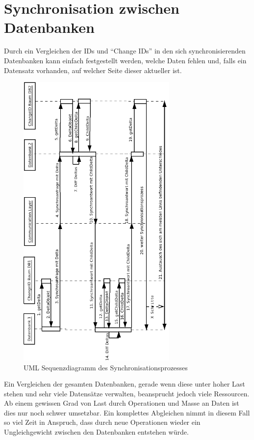 \documentclass[a4paper,11pt,oneside,%
headsepline,												%
footsepline,												%
bibtotocnumbered									%
]{scrreprt}
\begin{document}
\section{Synchronisation zwischen Datenbanken}
\label{sec:eBTreeSynchronisation}
Durch ein Vergleichen der IDs und \enquote{Change IDs} in den sich synchronisierenden Datenbanken kann einfach festgestellt werden, welche Daten fehlen und, falls ein Datensatz vorhanden, auf welcher Seite dieser aktueller ist. 
\newpage
\begin{figure}[h!]
        \centering
    \includegraphics[width=0.7\textwidth]{bilder/SynchroProzess.png}
    \caption{UML Sequenzdiagramm des Synchronisationsprozesses}
\end{figure}
\newpage
Ein Vergleichen der gesamten Datenbanken, gerade wenn diese unter hoher Last stehen und sehr viele Datensätze verwalten, beansprucht jedoch viele Ressourcen. Ab einem gewissen Grad von Last durch Operationen und Masse an Daten ist dies nur noch schwer umsetzbar. Ein komplettes Abgleichen nimmt in diesem Fall so viel Zeit in Anspruch, dass durch neue Operationen wieder ein Ungleichgewicht zwischen den Datenbanken entstehen würde.\\\\
\end{document}
